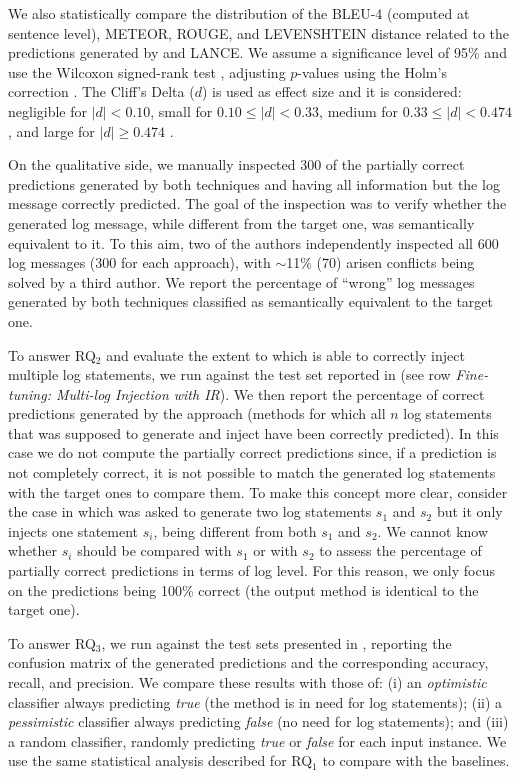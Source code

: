 We also statistically compare the distribution of the BLEU-4 (computed at sentence level), METEOR, ROUGE, and LEVENSHTEIN distance related to the predictions generated by \approach and LANCE. We assume a significance level of 95\% and use the Wilcoxon signed-rank test \cite{wilcoxon}, adjusting $p$-values using the Holm's correction \cite{Holm1979a}. The  Cliff's Delta ($d$) is used as effect size \cite{Gris2005a} and it is considered: negligible for $|d| < 0.10$, small for $0.10 \le |d| < 0.33$, medium for $0.33 \le |d| < 0.474$, and large for $|d| \ge 0.474$ \cite{Gris2005a}.

On the qualitative side, we manually inspected 300 of the partially correct predictions generated by both techniques and having all information but the log message correctly predicted. The goal of the inspection was to verify whether the generated log message, while different from the target one, was semantically equivalent to it. To this aim, two of the authors independently inspected all 600 log messages (300 for each approach), with $\sim$11\% (70) arisen conflicts being solved by a third author. We report the percentage of ``wrong'' log messages generated by both techniques classified as semantically equivalent to the target one.

To answer RQ$_2$ and evaluate the extent to which \approach is able to correctly inject multiple log statements, we run \approach against the test set reported in  (see row \emph{Fine-tuning: Multi-log Injection with IR}). We then report the percentage of correct predictions generated by the approach (\ie methods for which all $n$ log statements that \approach was supposed to generate and inject have been correctly predicted). In this case we do not compute the partially correct predictions since, if a prediction is not completely correct, it is not possible to match the generated log statements with the target ones to compare them. To make this concept more clear, consider the case in which \approach was asked to generate two log statements $s_1$ and $s_2$ but it only injects one statement $s_i$, being different from both $s_1$ and $s_2$. We cannot know whether $s_i$ should be compared with $s_1$ or with $s_2$ to assess the percentage of partially correct predictions in terms of \eg log level. For this reason, we only focus on the predictions being 100\% correct (\ie the output method is identical to the target one). 

To answer RQ$_3$, we run \approach against the test sets presented in , reporting the confusion matrix of the generated predictions and the corresponding accuracy, recall, and precision. We compare these results with those of: (i) an \emph{optimistic} classifier always predicting \emph{true} (\ie the method is in need for log statements); (ii) a \emph{pessimistic} classifier always predicting \emph{false} (\ie no need for log statements); and (iii) a random classifier, randomly predicting \emph{true} or \emph{false} for each input instance. We use the same statistical analysis described for RQ$_1$ to compare \approach with the baselines.